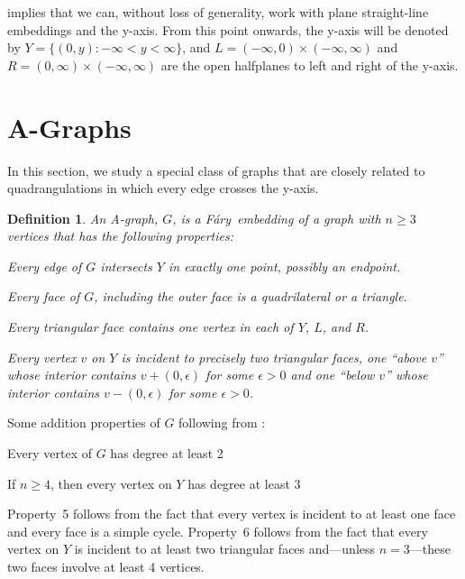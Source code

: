 \documentclass{patmorin}
\newtheorem{definition}{Definition}
\newcommand{\Fary}{Fáry}
\begin{document}
 implies that we can, without loss of
generality, work with plane straight-line embeddings and the
y-axis.  From this point onwards, the y-axis will be denoted by
$Y=\{(0,y):-\infty<y<\infty\}$, and $L=(-\infty,0)\times(-\infty,\infty)$
and $R=(0,\infty)\times(-\infty,\infty)$ are the open halfplanes to left and right of the y-axis.

\section{A-Graphs}

In this section, we study a special class of graphs that are closely
related to quadrangulations in which every edge crosses the y-axis.

\begin{definition}
  An \emph{A-graph}, $G$, is a \Fary\ embedding of a graph with $n\ge 3$ vertices that has the following properties:
  \begin{compactenum}
   \item Every edge of $G$ intersects $Y$ in exactly one point, possibly an endpoint.
   \item Every face of $G$, including the outer face is a quadrilateral or a triangle.
   \item Every triangular face contains one vertex in each of $Y$, $L$,
   and $R$.  
   \item Every vertex $v$ on $Y$ is incident to precisely
   two triangular faces, one ``above $v$'' whose interior contains $v+(0,\epsilon)$ for some $\epsilon>0$ and one ``below $v$'' whose interior contains $v-(0,\epsilon)$ for some $\epsilon >0$.
  \end{compactenum}
\end{definition}

Some addition properties of $G$ following from :
\begin{compactenum}\setcounter{enumi}{4}
  \item Every vertex of $G$ has degree at least 2   
  \item If $n\ge 4$, then every vertex on $Y$ has degree at least 3 
\end{compactenum}
Property~5 follows from the fact that every vertex is incident to at
least one face and every face is a simple cycle.
Property~6 follows from the fact that every vertex on $Y$ is incident
to at least two triangular faces and---unless $n=3$---these two faces
involve at least 4 vertices.
\end{document}
